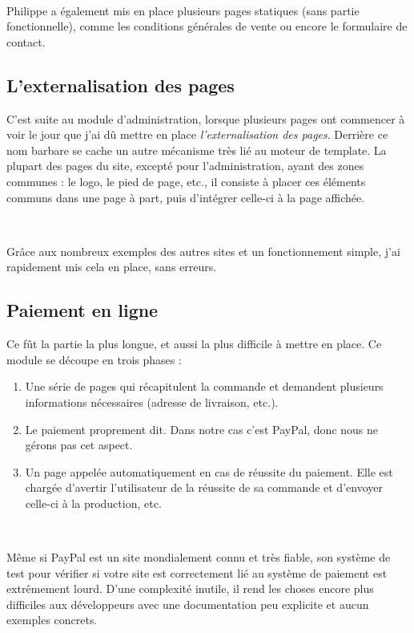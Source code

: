 ~

Philippe a également mis en place plusieurs pages statiques (sans partie fonctionnelle), comme les conditions générales de vente ou encore le formulaire de contact.

\subsection{L'externalisation des pages}
C'est suite au module d'administration, lorsque plusieurs pages ont commencer à voir le jour que j'ai dû mettre en place \emph{l'externalisation des pages}. Derrière ce nom barbare se cache un autre mécanisme très lié au moteur de template. La plupart des pages du site, excepté pour l'administration, ayant des zones communes : le logo, le pied de page, etc., il consiste à placer ces éléments communs dans une page à part, puis d'intégrer celle-ci à la page affichée.

~

Grâce aux nombreux exemples des autres sites et un fonctionnement simple, j'ai rapidement mis cela en place, sans erreurs.

\subsection{Paiement en ligne}
Ce fût la partie la plus longue, et aussi la plus difficile à mettre en place. Ce module se découpe en trois phases :
\begin{enumerate}
	\item Une série de pages qui récapitulent la commande et demandent plusieurs informations nécessaires (adresse de livraison, etc.).
	\item Le paiement proprement dit. Dans notre cas c'est PayPal, donc nous ne gérons pas cet aspect.
	\item Un page appelée automatiquement en cas de réussite du paiement. Elle est chargée d'avertir l'utilisateur de la réussite de sa commande et d'envoyer celle-ci à la production, etc.
\end{enumerate}

~

Même si PayPal est un site mondialement connu et très fiable, son système de test pour vérifier si votre site est correctement lié au système de paiement est extrêmement lourd. D'une complexité inutile, il rend les choses encore plus difficiles aux développeurs avec une documentation peu explicite et aucun exemples concrets.

~

